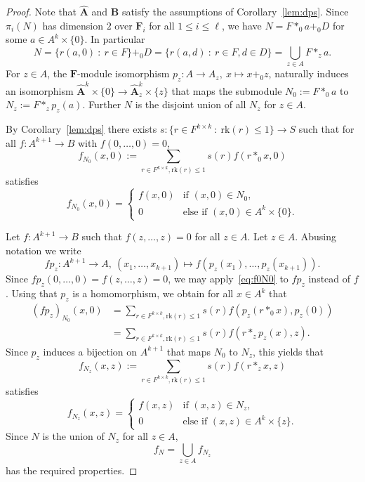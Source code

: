 \documentclass[12pt]{amsart}
\numberwithin{equation}{section}
\theoremstyle{plain}
\theoremstyle{definition}
\newcommand{\st}{\ :\ }
\newcommand{\A}{\mathbf{A}}
\newcommand{\B}{\mathbf{B}}
\newcommand{\F}{\mathbf{F}}
\newcommand{\rk}{\mathrm{rk}}
\begin{document}
\begin{proof}
  Note that $\hat{\A}$ and $\B$ satisfy the assumptions of Corollary~\ref{lem:dps}.
  Since $\pi_i(N)$ has dimension $2$ over $\F_i$ for all $1 \le i \le \ell$, 
    we have $N = F*_0 a+_0 D$ for some $a\in A^k\times \{0\}$. 
  In particular
    \[ N = \{r(a,0) \st r\in F \} +_0 D = \{r(a,d) \st r\in F, d\in D \} = \bigcup_{z\in A} F*_z a. \]
  For $z\in A$, the $\F$-module isomorphism $p_z\colon A \to A_z,\ x\mapsto x+_0z$, 
    naturally induces an isomorphism 
    $\hat{\A}^k \times \{0\} \to \hat{\A}_z^k \times \{z\}$ 
    that maps the submodule $N_0 := F *_0 a$ to
    $N_z := F *_z p_z(a)$. Further $N$ is the disjoint union of all $N_z$ for $z\in A$.

  By Corollary~\ref{lem:dps} there exists $s\colon \{r\in F^{k\times k} \st \rk(r)\leq 1 \} \to S$ 
    such that for all $f\colon A^{k+1}\to B$ with $f(0,\dots,0)=0$, 
    \begin{equation} \label{eq:f0N0}
      f_{N_0}(x,0) := \sum_{r\in F^{k\times k}, \rk(r)\leq 1} s(r) f(r*_0x,0)
    \end{equation}
    satisfies
    \[ f_{N_0}(x,0) = 
      \begin{cases} 
        f(x,0) & \text{if } (x,0)\in N_0, \\
        0 & \text{else if } (x,0) \in A^k\times\{0\}. 
      \end{cases} 
    \]

  Let $f\colon A^{k+1}\to B$ such that $f(z,\dots,z)=0$ for all $z\in A$.
  Let $z\in A$. 
  Abusing notation we write
    \[ fp_z \colon A^{k+1}\to A,\ (x_1,\dots,x_{k+1}) \mapsto f(p_z(x_1),\dots,p_z(x_{k+1})). \]
  Since $fp_z(0,\dots,0) = f(z,\dots,z) = 0$, we may apply~\eqref{eq:f0N0} to $fp_z$ instead of $f$.
  Using that $p_z$ is a homomorphism, we obtain for all $x\in A^k$ that
    \begin{align*}
      (fp_z)_{N_0}(x,0) &= \sum_{r\in F^{k\times k}, \rk(r)\leq 1} s(r) f(p_z(r*_0x),p_z(0)) \\
      &= \sum_{r\in F^{k\times k}, \rk(r)\leq 1} s(r) f(r*_zp_z(x),z).
    \end{align*}
  Since $p_z$ induces a bijection on $A^{k+1}$ that maps $N_0$ to $N_z$, this yields that
    \[ f_{N_z}(x,z) := \sum_{r\in F^{k\times k}, \rk(r)\leq 1} s(r) f(r*_zx,z) \]
    satisfies
    \[ f_{N_z}(x,z) = 
      \begin{cases} 
        f(x,z) & \text{if } (x,z)\in N_z, \\
        0 & \text{else if } (x,z)\in A^k\times\{z\} . 
      \end{cases} 
    \]
  Since $N$ is the union of $N_z$ for all $z\in A$,
    \[ f_N = \bigcup_{z\in A} f_{N_z} \]
    has the required properties. 
\end{proof}  
\end{document}

